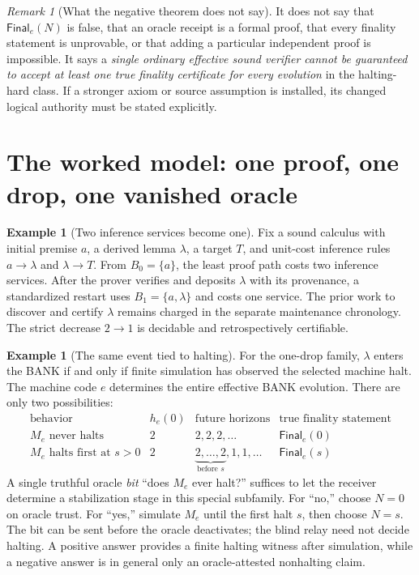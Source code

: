 \documentclass[11pt,letterpaper]{article}
\theoremstyle{definition}
\newtheorem{example}[theorem]{Example}
\theoremstyle{remark}
\newtheorem{remark}[theorem]{Remark}
\newcommand{\Fin}{\mathsf{Final}}
\begin{document}
\begin{remark}[What the negative theorem does not say]
It does not say that $\Fin_e(N)$ is false, that an oracle receipt is a formal proof, that every finality statement is unprovable, or that adding a particular independent proof is impossible. It says a \emph{single ordinary effective sound verifier cannot be guaranteed to accept at least one true finality certificate for every evolution} in the halting-hard class. If a stronger axiom or source assumption is installed, its changed logical authority must be stated explicitly.
\end{remark}

\section{The worked model: one proof, one drop, one vanished oracle}
\begin{example}[Two inference services become one]
Fix a sound calculus with initial premise $a$, a derived lemma $\lambda$, a target $T$, and unit-cost inference rules $a\to\lambda$ and $\lambda\to T$. From $B_0=\{a\}$, the least proof path costs two inference services. After the prover verifies and deposits $\lambda$ with its provenance, a standardized restart uses $B_1=\{a,\lambda\}$ and costs one service. The prior work to discover and certify $\lambda$ remains charged in the separate maintenance chronology. The strict decrease $2\to1$ is decidable and retrospectively certifiable.
\end{example}
\begin{example}[The same event tied to halting]
For the one-drop family, $\lambda$ enters the BANK if and only if finite simulation has observed the selected machine halt. The machine code $e$ determines the entire effective BANK evolution. There are only two possibilities:
\[
\begin{array}{c|c|c|c}
\text{behavior}&h_e(0)&\text{future horizons}&\text{true finality statement}\\\hline
M_e\text{ never halts}&2&2,2,2,\ldots&\Fin_e(0)\\
M_e\text{ halts first at }s>0&2&\underbrace{2,\ldots,2}_{\text{before }s},1,1,\ldots&\Fin_e(s)
\end{array}
\]
A single truthful oracle \emph{bit} ``does $M_e$ ever halt?'' suffices to let the receiver determine a stabilization stage in this special subfamily. For ``no,'' choose $N=0$ on oracle trust. For ``yes,'' simulate $M_e$ until the first halt $s$, then choose $N=s$. The bit can be sent before the oracle deactivates; the blind relay need not decide halting. A positive answer provides a finite halting witness after simulation, while a negative answer is in general only an oracle-attested nonhalting claim.
\end{example}
\end{document}
